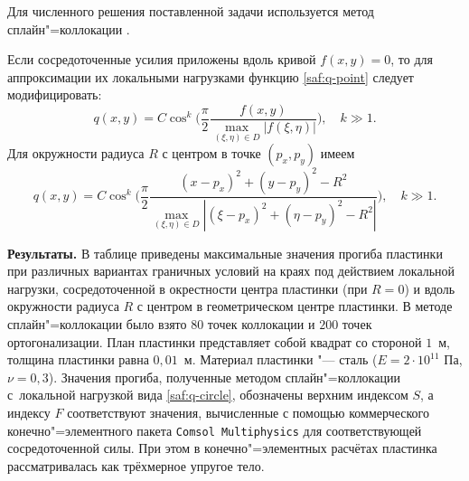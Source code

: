 Для численного решения поставленной задачи используется метод сплайн"=коллокации \cite{saf:grigorenko1996, saf:grigorenko1987, saf:nedorezov}. 

Если сосредоточенные усилия приложены вдоль кривой $f(x, y) = 0$, то для аппроксимации их локальными нагрузками функцию \eqref{saf:q-point} следует модифицировать:
$$
q(x, y) = C \cos^k \biggl(\frac{\pi}{2}\frac{f(x, y)}{\max\limits_{\left(\xi,\eta\right) \in D}\left|f\left(\xi,\eta\right)\right|}\biggr), \quad  k \gg 1.
$$
Для окружности радиуса $R$ с центром в точке $(p_x, p_y)$ имеем
\begin{equation}\label{saf:q-circle}
q(x, y) = C \cos^k \biggl(\frac{\pi}{2}\frac{\left(x - p_x\right)^2 + \left(y-p_y\right)^2 - R^2}{\max\limits_{\left(\xi,\eta\right) \in D}|(\xi-p_x)^2 +(\eta-p_y)^2 -R^2|}\biggr), \quad  k \gg 1.
\end{equation}

\smallskip

\textbf{Результаты.} 
В таблице приведены максимальные значения прогиба пластинки при различных вариантах граничных условий на краях под действием локальной нагрузки, сосредоточенной в окрестности центра пластинки (при $R = 0$) и вдоль окружности радиуса $R$ с центром в геометрическом центре пластинки. 
В методе сплайн"=коллокации было взято $80$ точек коллокации и $200$ точек ортогонализации. 
План пластинки представляет собой квадрат со стороной $1$~м, толщина пластинки равна $0,01$~м. 
Материал пластинки "--- сталь ($E = 2 \cdot 10^{11}$ Па, $\nu = 0,3$). 
Значения прогиба, полученные методом сплайн"=коллокации с~локальной нагрузкой вида \eqref{saf:q-circle}, обозначены верхним индексом $S$, а индексу $F$ соответствуют значения, вычисленные с помощью коммерческого конечно"=элементного пакета {\tt Comsol Multiphysics} для соответствующей сосредоточенной силы. При этом в конечно"=элементных расчётах пластинка рассматривалась как трёхмерное упругое тело.

